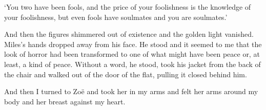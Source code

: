 `You two have been fools, and the price of your foolishness is the
knowledge of your foolishness, but even fools have soulmates and you
are soulmates.'

And then the figures shimmered out of existence and the golden light
vanished. Miles's hands dropped away from his face. He stood and it
seemed to me that the look of horror had been transformed to one of
what might have been peace or, at least, a kind of peace. Without a
word, he stood, took his jacket from the back of the chair and
walked out of the door of the flat, pulling it closed behind him.

And then I turned to Zo{\"e} and took her in my arms and felt her
arms around my body and her breast against my heart.
\vfill\eject

